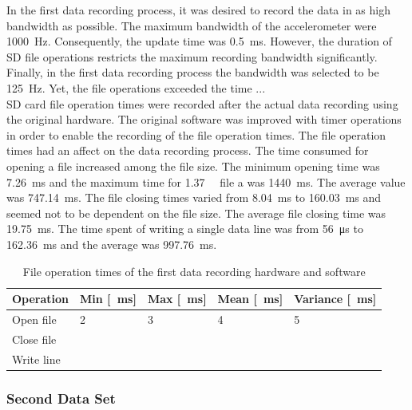 \documentclass[english,12pt,a4paper,pdftex,elec,utf8]{aaltothesis}
\begin{document}
In the first data recording process, it was desired to record the data in as high bandwidth as possible. The maximum bandwidth of the accelerometer were \SI{1000}{\hertz}. Consequently, the update time was \SI{0.5}{\milli \second}. However, the duration of SD file operations restricts the maximum recording bandwidth significantly. Finally, in the first data recording process the bandwidth was selected to be \SI{125}{\hertz}. Yet, the file operations exceeded the time ... \\

SD card file operation times were recorded after the actual data recording using the original hardware. The original software was improved with timer operations in order to enable the recording of the file operation times. The file operation times had an affect on the data recording process. The time consumed for opening a file increased among the file size. The minimum opening time was \SI{7.26}{\milli\second} and the maximum time for \SI{1.37}{\giga \byte} file a was \SI{1440}{\milli \second}. The average value was \SI{747.14}{\milli \second}. The file closing times varied from \SI{8.04}{\milli \second} to \SI{160.03}{\milli \second} and seemed not to be dependent on the file size. The average file closing time was \SI{19.75}{\milli \second}. The time spent of writing a single data line was from \SI{56}{\micro \second} to \SI{162.36}{\milli\second} and the average was \SI{997.76}{\milli\second}. \\

\begin{table} \caption{File operation times of the first data recording hardware and software}
\centering
\begin{tabular}{| l | l | l | l | l |}
\hline
Operation & Min [\SI{}{\milli \second}] & Max [\SI{}{\milli \second}] & Mean [\SI{}{\milli \second}]& Variance [\SI{}{\milli \second}]\\ \hline
Open file & 2 & 3 & 4 & 5 \\ \hline
Close file &  &  &  &  \\ \hline
Write line &  &  &  &  \\ \hline
\end{tabular}
\end{table}

\subsubsection{Second Data Set} \label{seconddatasetsection}
\end{document}

